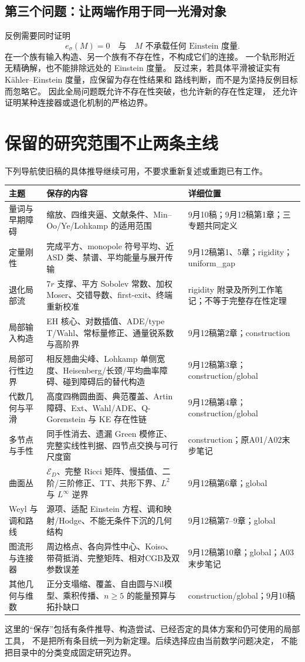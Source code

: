 \documentclass[UTF8,fontset=fandol,zihao=-4]{ctexart}
\begin{document}
\subsection{第三个问题：让两端作用于同一光滑对象}
反例需要同时证明
\[
 e_\sigma(M)=0
 \quad\text{与}\quad
 M\text{ 不承载任何 Einstein 度量}.
\]
在一个族有输入构造、另一个族有不存在性，不构成它们的连接。
一个轨形附近无精确解，也不能排除远处的 Einstein 度量。
反过来，若具体平滑被证实有 Kähler--Einstein 度量，应保留为存在性结果和
路线判断，而不是为坚持反例目标而忽略它。
因此全局问题既允许不存在性突破，也允许新的存在性定理，
还允许证明某种连接器或退化机制的严格边界。

\section{保留的研究范围不止两条主线}
下列导航使旧稿的具体推导继续可用，不要求重新复述或重跑已有工作。
\begin{longtable}{p{}p{}p{}}
\toprule 主题 & 保存的内容 & 详细位置\\\midrule\endhead
量词与早期障碍 & 缩放、四维夹逼、文献条件、Min--Oo/Ye/Lohkamp 的适用范围 & 9月10稿；9月12稿第1章；三专题共同定义\\
定量刚性 & 完成平方、monopole 符号平均、近 ASD 类、禁谱、平均能量与展开传输 & 9月12稿第1、5章；rigidity；uniform\_gap\\
退化局部流 & $7r$ 支撑、平方 Sobolev 常数、加权 Moser、交错导数、first-exit、终端重新校准 & rigidity 附录及所列工作笔记；不等于完整存在性定理\\
局部输入构造 & EH 核心、对数插值、ADE/type T/Wahl、常标量修正、通量锐系数与高阶界 & 9月12稿第2章；construction\\
局部可行性边界 & 相反翘曲尖峰、Lohkamp 单侧宽度、Heisenberg/长颈/平均曲率障碍、碰到障碍后的替代构造 & 9月12稿第3章；construction/global\\
代数几何与平滑 & 高度四椭圆曲面、典范覆盖、Artin 障碍、Ext、Wahl/ADE、Q-Gorenstein 与 KE 存在性链 & 9月12稿第4章；construction/global\\
多节点与手性 & 同手性消去、遗漏 Green 模修正、完整实线性判据、四节点交换与可行尺度窗 & construction；原A01/A02末步笔记\\
曲面丛 & $\mathcal E_D$、完整 Ricci 矩阵、慢插值、二阶/三阶修正、TT、共形下界、$L^2$ 与 $L^\infty$ 逆界 & 9月12稿第6章；global\\
Weyl 与调和路线 & 源项、适配 Einstein 方程、调和映射/Hodge、不能无条件下沉的几何结构 & 9月12稿第7--9章；global\\
图流形与连接器 & 周边格点、各向异性中心、Koiso、带荷抵消、完整矩阵、相对CGB及双参数误差 & 9月12稿第10章；global；A03末步笔记\\
其他几何与维数 & 正分支塌缩、覆盖、自由圆与Nil模型、乘积传播、$n\ge5$ 的能量预算与拓扑缺口 & construction/global；9月10稿\\
\bottomrule
\end{longtable}
这里的“保存”包括有条件推导、构造尝试、已经否定的具体方案和仍可使用的局部工具，
不是把所有条目统一列为新定理。后续选择应由当前数学问题决定，
不能把目录中的分类变成固定研究边界。
\end{document}
